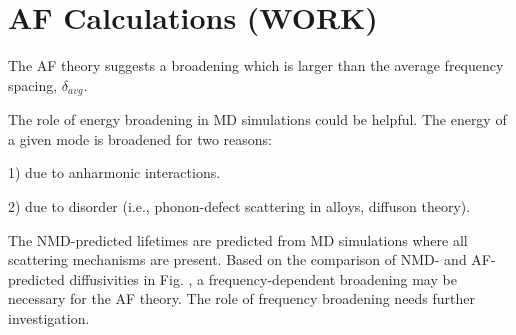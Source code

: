 

\section{\label{Appendix:AF}AF Calculations (WORK)}



The AF theory suggests a broadening which is larger than the average 
frequency spacing, $\delta_{avg}$. 

The role of energy broadening in MD simulations could be helpful. The 
energy of a given mode is broadened for two reasons: 

1) due to anharmonic interactions.

2) due to disorder (i.e., phonon-defect scattering in alloys, 
diffuson theory). 

The NMD-predicted lifetimes are predicted from MD simulations where 
all scattering mechanisms are present. Based on the comparison 
of NMD- and AF-predicted diffusivities in Fig. , a frequency-dependent 
broadening may be necessary for the AF theory. The role of frequency 
broadening needs further investigation. 

